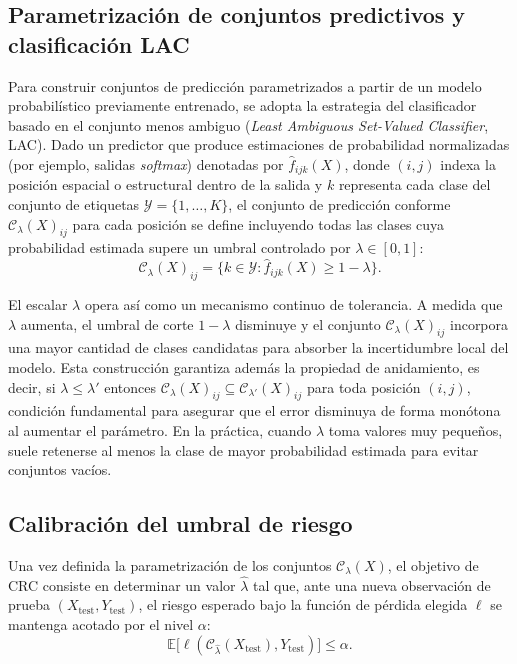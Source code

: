 \subsection{Parametrización de conjuntos predictivos y clasificación LAC}

Para construir conjuntos de predicción parametrizados a partir de un modelo probabilístico previamente entrenado, se adopta la estrategia del clasificador basado en el conjunto menos ambiguo (\textit{Least Ambiguous Set-Valued Classifier}, LAC). Dado un predictor que produce estimaciones de probabilidad normalizadas (por ejemplo, salidas \textit{softmax}) denotadas por $\hat{f}_{ijk}(X)$, donde $(i,j)$ indexa la posición espacial o estructural dentro de la salida y $k$ representa cada clase del conjunto de etiquetas $\mathcal{Y} = \{1, \dots, K\}$, el conjunto de predicción conforme $\mathcal{C}_\lambda(X)_{ij}$ para cada posición se define incluyendo todas las clases cuya probabilidad estimada supere un umbral controlado por $\lambda \in [0,1]$:
\begin{equation}
    \mathcal{C}_\lambda(X)_{ij} = \{ k \in \mathcal{Y} : \hat{f}_{ijk}(X) \geq 1 - \lambda \}.
\end{equation}

El escalar $\lambda$ opera así como un mecanismo continuo de tolerancia. A medida que $\lambda$ aumenta, el umbral de corte $1-\lambda$ disminuye y el conjunto $\mathcal{C}_\lambda(X)_{ij}$ incorpora una mayor cantidad de clases candidatas para absorber la incertidumbre local del modelo. Esta construcción garantiza además la propiedad de anidamiento, es decir, si $\lambda \leq \lambda'$ entonces $\mathcal{C}_\lambda(X)_{ij} \subseteq \mathcal{C}_{\lambda'}(X)_{ij}$ para toda posición $(i,j)$, condición fundamental para asegurar que el error disminuya de forma monótona al aumentar el parámetro. En la práctica, cuando $\lambda$ toma valores muy pequeños, suele retenerse al menos la clase de mayor probabilidad estimada para evitar conjuntos vacíos.

\subsection{Calibración del umbral de riesgo}

Una vez definida la parametrización de los conjuntos $\mathcal{C}_\lambda(X)$, el objetivo de CRC consiste en determinar un valor $\hat{\lambda}$ tal que, ante una nueva observación de prueba $(X_{\text{test}}, Y_{\text{test}})$, el riesgo esperado bajo la función de pérdida elegida $\ell$ se mantenga acotado por el nivel $\alpha$:
\begin{equation}
    \mathbb{E}\big[ \ell(\mathcal{C}_{\hat{\lambda}}(X_{\text{test}}), Y_{\text{test}}) \big] \leq \alpha.
\end{equation}


